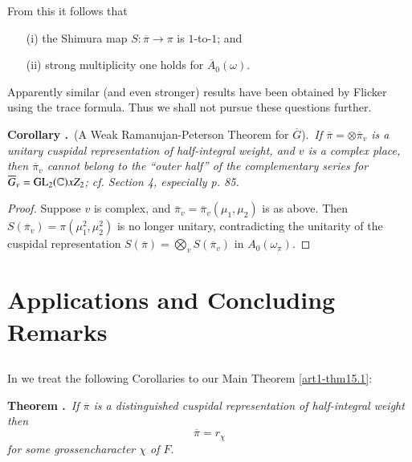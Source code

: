 From this it follows that
\begin{itemize}
\item[(i)] the Shimura map $S:\overline{\pi}\to \pi$ is $1$-to-$1$; and

\item[(ii)] strong multiplicity one holds for $\overline{A}_{0}(\omega)$.
\end{itemize}

Apparently similar (and even stronger) results have been obtained by Flicker using the trace formula. Thus we shall not pursue these questions further.

\medskip
\noindent
{\bf Corollary .\label{art1-coro15.8}}~(A Weak Ramanujan-Peterson Theorem for $\overline{G}$).~{\em If $\overline{\pi}=\otimes \overline{\pi}_{v}$ is a unitary cuspidal representation of half-integral weight, and $v$ is a complex place, then $\overline{\pi}_{v}$ cannot belong to the ``outer half'' of the complementary series for $\overline{G}_{v}=\mathrm{GL}_{2}(\mathbb{C})xZ_{2}$; cf. \cite{Ge} Section 4, especially p. 85.}

\begin{proof}
Suppose $v$ is complex, and $\overline{\pi}_{v}=\overline{\pi}_{v}(\mu_{1},\mu_{2})$ is as above. Then\pageoriginale $S(\overline{\pi}_{v})=\pi(\mu^{2}_{1},\mu^{2}_{2})$ is no longer unitary, contradicting the unitarity of the cuspidal representation $S(\overline{\pi})=\bigotimes\limits_{v}S(\overline{\pi}_{v})$ in $A_{0}(\omega_{\pi})$.
\end{proof}

\section{Applications and Concluding Remarks}\label{art1-sec16}

\subsection{}\label{art1-sec16.1}
In \cite{GePS2} we treat the following Corollaries to our Main Theorem \ref{art1-thm15.1}:

\eject
\noindent
{\bf Theorem .\label{art1-thm-A}}~{\em If $\overline{\pi}$ is a distinguished cuspidal representation of half-integral weight then}
$$
\overline{\pi}=r_{\chi}
$$
{\em for some grossencharacter $\chi$ of $F$}.
\smallskip

